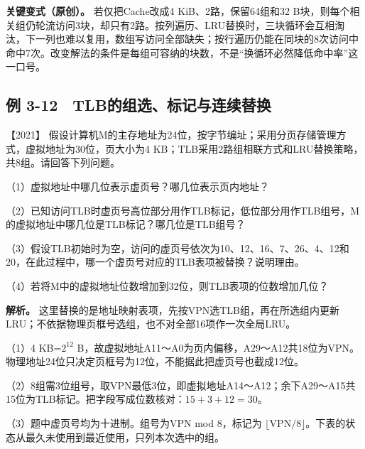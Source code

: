\textbf{关键变式（原创）。} 若仅把Cache改成4 KiB、2路，保留64组和32 B块，则每个相关组仍轮流访问3块，却只有2路。按列遍历、LRU替换时，三块循环会互相淘汰，下一列也难以复用，数组写访问全部缺失；按行遍历仍能在同块的8次访问中命中7次。改变解法的条件是每组可容纳的块数，不是``换循环必然降低命中率''这一口号。

\subsection{例 3-12　TLB的组选、标记与连续替换}\label{co-ex3-12}

\noindent{}【2021】 假设计算机M的主存地址为24位，按字节编址；采用分页存储管理方式，虚拟地址为30位，页大小为4 KB；TLB采用2路组相联方式和LRU替换策略，共8组。请回答下列问题。

（1）虚拟地址中哪几位表示虚页号？哪几位表示页内地址？

（2）已知访问TLB时虚页号高位部分用作TLB标记，低位部分用作TLB组号，M的虚拟地址中哪几位是TLB标记？哪几位是TLB组号？

（3）假设TLB初始时为空，访问的虚页号依次为10、12、16、7、26、4、12和20，在此过程中，哪一个虚页号对应的TLB表项被替换？说明理由。

（4）若将M中的虚拟地址位数增加到32位，则TLB表项的位数增加几位？


\textbf{解析。} 这里替换的是地址映射表项，先按VPN选TLB组，再在所选组内更新LRU；不依据物理页框号选组，也不对全部16项作一次全局LRU。

（1）4 KB=\(2^{12}\) B，故虚拟地址A11～A0为页内偏移，A29～A12共18位为VPN。物理地址24位只决定页框号为12位，不能据此把虚页号也截成12位。

（2）8组需3位组号，取VPN最低3位，即虚拟地址A14～A12；余下A29～A15共15位为TLB标记。把字段写成位数核对：\(15+3+12=30\)。

（3）题中虚页号均为十进制。组号为VPN mod 8，标记为 \(\lfloor\mathrm{VPN}/8\rfloor\)。下表的状态从最久未使用到最近使用，只列本次选中的组。


